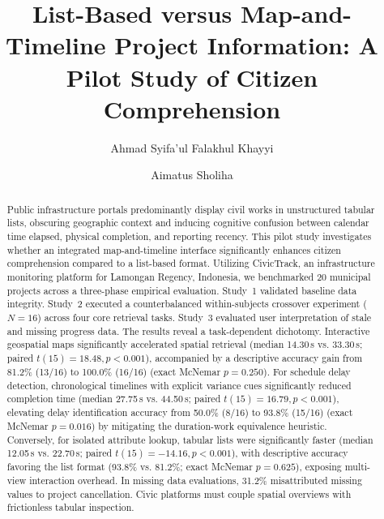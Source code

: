 \documentclass[runningheads]{llncs}
\begin{document}
%
\title{List-Based versus Map-and-Timeline Project Information: A Pilot Study of Citizen Comprehension}
%
%
\author{Ahmad Syifa'ul Falakhul Khayyi \and Aimatus Sholiha}
%
%
%
\maketitle              %
%
\begin{abstract}
Public infrastructure portals predominantly display civil works in unstructured tabular lists, obscuring geographic context and inducing cognitive confusion between calendar time elapsed, physical completion, and reporting recency. This pilot study investigates whether an integrated map-and-timeline interface significantly enhances citizen comprehension compared to a list-based format. Utilizing CivicTrack, an infrastructure monitoring platform for Lamongan Regency, Indonesia, we benchmarked 20 municipal projects across a three-phase empirical evaluation. Study~1 validated baseline data integrity. Study~2 executed a counterbalanced within-subjects crossover experiment ($N = 16$) across four core retrieval tasks. Study~3 evaluated user interpretation of stale and missing progress data. The results reveal a task-dependent dichotomy. Interactive geospatial maps significantly accelerated spatial retrieval (median 14.30\,s vs. 33.30\,s; paired $t(15) = 18.48, p < 0.001$), accompanied by a descriptive accuracy gain from 81.2\% (13/16) to 100.0\% (16/16) (exact McNemar $p = 0.250$). For schedule delay detection, chronological timelines with explicit variance cues significantly reduced completion time (median 27.75\,s vs. 44.50\,s; paired $t(15) = 16.79, p < 0.001$), elevating delay identification accuracy from 50.0\% (8/16) to 93.8\% (15/16) (exact McNemar $p = 0.016$) by mitigating the duration-work equivalence heuristic. Conversely, for isolated attribute lookup, tabular lists were significantly faster (median 12.05\,s vs. 22.70\,s; paired $t(15) = -14.16, p < 0.001$), with descriptive accuracy favoring the list format (93.8\% vs. 81.2\%; exact McNemar $p = 0.625$), exposing multi-view interaction overhead. In missing data evaluations, 31.2\% misattributed missing values to project cancellation. Civic platforms must couple spatial overviews with frictionless tabular inspection.

\end{abstract}
%
%
%
\end{document}
